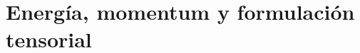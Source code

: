 \documentclass[../main.tex]{subfiles}
\begin{document}
\chapter{Energía, momentum y formulación tensorial}

\end{document}
